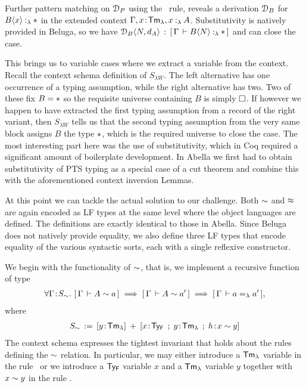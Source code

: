 
Further pattern matching on $\mathcal{D}_P$ using the \tpi~rule,
reveals a derivation $\mathcal{D}_B$ for $\typingLh{\lpApp{B}{x}}{\Prp}$ in the extended context $\Gamma, x\!:\!\mathsf{Tm_{\lambda}}, x \mathbin{:_{\lambda}} A$.
%
Substitutivity is natively provided in Beluga, so we have $\lpApp{\D_B}{N,d_A} \OF \bc{\Gamma}{\typingLh{\lpApp{B}{N}}{\Prp}}$ and can close the case.

This brings us to variable cases where we extract a variable from the context.
Recall the context schema definition of $S_{\lambda W}$.
The left alternative has one occurrence of a typing assumption, while the right alternative has two.
Two of these fix $B = \Prp$ so the requisite universe containing $B$ is simply $\square$.
If however we happen to have extracted the first typing assumption from a record of the right variant, then $S_{\lambda W}$ tells us that the second typing assumption from the very same block assigns $B$ the type $\Prp$, which is the required universe to close the case.
%
The most interesting part here was the use of substitutivity, which in Coq required a significant amount of boilerplate development.
In Abella we first had to obtain substitutivity of PTS typing as a special case of a cut theorem and combine this with the aforementioned context inversion Lemmas.

At this point we can tackle the actual solution to our challenge.
Both $\mathrel{\sim}$ and $\mathrel{\approx}$ are again encoded as LF types at the same level where the object languages are defined. The definitions are exactly identical to those in Abella.
Since Beluga does not natively provide equality, we also define three LF types that encode equality of the various syntactic sorts, each with a single reflexive constructor.

We begin with the functionality of $\mathrel{\sim}$, that is, we implement a recursive function of type
\begin{align*}
  \forall \Gamma \!:\! S_{\mathrel{\sim}}.\,\, [\,\Gamma\,\vdash A \mathrel{\sim} a\,] \implies [\,\Gamma\,\vdash A \mathrel{\sim} a'\,] \implies [\,\Gamma\,\vdash a =_{\lambda} a'\,],
\end{align*}
where
\begin{align*}
  S_{\tyr} \eqdef [y \of \TmL] \mrel{+} [x\of\TyF \mrel{;} y\of\TmL \mrel{;} h\of x \tyr y]
\end{align*}
The context schema expresses the tightest invariant that holds about the rules defining the $\mathrel{\sim}$ relation.%
In particular, we may either introduce a $\mathsf{Tm_{\lambda}}$ variable in the rule \rarr~or we introduce a $\mathsf{Ty_{F}}$ variable $x$ and a $\mathsf{Tm_{\lambda}}$ variable $y$ together with $x \mathrel{\sim} y$ in the rule \rall.

